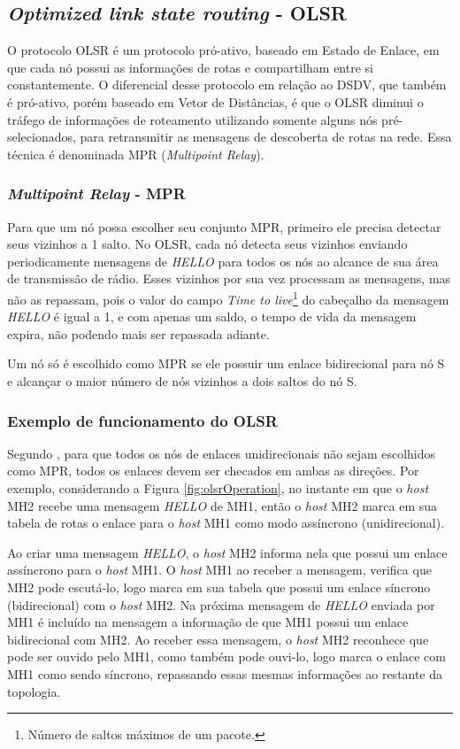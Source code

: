 \subsection{\textit{Optimized link state routing} - OLSR}\label{subOLSR}
O protocolo OLSR \cite{rfc3626} \'e um protocolo pr\'o-ativo, baseado em Estado de Enlace, em que cada n\'o possui as informa\c{c}\~oes de rotas e compartilham entre si constantemente. 
O diferencial desse protocolo em rela\c{c}\~ao ao DSDV, que tamb\'em \'e pr\'o-ativo, por\'em baseado em Vetor de Dist\^ancias, \'e que o OLSR diminui o tr\'afego de informa\c{c}\~oes de roteamento utilizando somente alguns n\'os pr\'e-selecionados, para retransmitir as mensagens de descoberta de rotas na rede.
Essa t\'ecnica \'e denominada MPR (\textit{Multipoint Relay}).

\subsubsection{\textit{Multipoint Relay} - MPR}
Para que um n\'o possa escolher seu conjunto MPR, primeiro ele precisa detectar seus vizinhos a 1 salto. 
No OLSR, cada n\'o detecta seus vizinhos enviando periodicamente mensagens de \textit{HELLO} para todos os n\'os ao alcance de sua \'area de transmiss\~ao de r\'adio.
Esses vizinhos por sua vez processam as mensagens, mas n\~ao as repassam, pois o valor do campo \textit{Time to live}\footnote{N\'umero de saltos m\'aximos de um pacote.} do cabe\c{c}alho da mensagem \textit{HELLO} \'e igual a 1, e com apenas um saldo, o tempo de vida da mensagem expira, n\~ao podendo mais ser repassada adiante.

Um n\'o s\'o \'e escolhido como MPR se ele possuir um enlace bidirecional para n\'o S e alcan\c{c}ar o maior n\'umero de n\'os vizinhos a dois saltos do n\'o S. 

\subsubsection{Exemplo de funcionamento do OLSR}
Segundo \cite{rfc3626}, para que todos os n\'os de enlaces unidirecionais n\~ao sejam escolhidos como MPR, todos os enlaces devem ser checados em ambas as dire\c{c}\~oes.
Por exemplo, considerando a Figura \ref{fig:olsrOperation}, no instante em que o \textit{host} MH2 recebe uma mensagem \textit{HELLO} de MH1, ent\~ao o \textit{host} MH2 marca em sua tabela de rotas o enlace para o \textit{host} MH1 como modo ass\'incrono (unidirecional).

Ao criar uma mensagem \textit{HELLO}, o \textit{host} MH2 informa nela que possui um enlace ass\'incrono para o \textit{host} MH1. 
O \textit{host} MH1 ao receber a mensagem, verifica que MH2 pode escut\'a-lo, logo marca em sua tabela que possui um enlace s\'incrono (bidirecional) com o \textit{host} MH2. 
Na pr\'oxima mensagem de \textit{HELLO} enviada por MH1 \'e inclu\'ido na mensagem a informa\c{c}\~ao de que MH1 possui um enlace bidirecional com MH2. 
Ao receber essa mensagem, o \textit{host} MH2 reconhece que pode ser ouvido pelo MH1, como tamb\'em pode ouvi-lo, logo marca o enlace com MH1 como sendo s\'incrono, repassando essas mesmas informa\c{c}\~oes ao restante da topologia.

